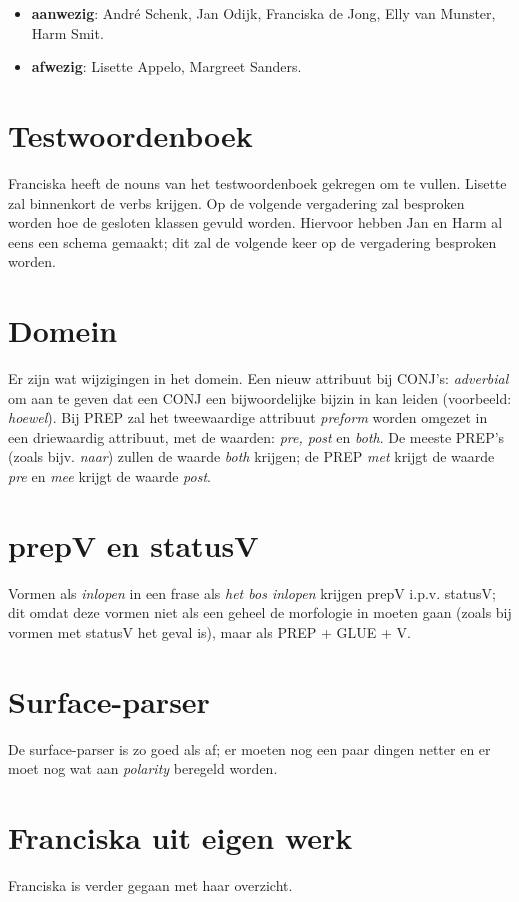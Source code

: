 

   \RosSupersedes{-}
   \MakeRosTitle
%
%

\begin{itemize}
  \item {\bf aanwezig}: Andr\'{e} Schenk, 
             Jan Odijk, Franciska de Jong, 
             Elly van Munster, Harm Smit.
  \item {\bf afwezig}: Lisette Appelo, Margreet Sanders.
\end{itemize}

\section{Testwoordenboek}

Franciska heeft de nouns van het testwoordenboek gekregen om te vullen. Lisette
zal binnenkort de verbs krijgen. Op de volgende vergadering zal besproken 
worden hoe de gesloten klassen gevuld worden. Hiervoor hebben Jan en Harm al 
eens een schema gemaakt; dit zal de volgende keer op de vergadering besproken 
worden.

\section{Domein}

Er zijn wat wijzigingen in het domein. Een nieuw attribuut bij CONJ's:
{\em adverbial} om aan te geven dat een CONJ een bijwoordelijke bijzin in kan 
leiden (voorbeeld: {\em hoewel}). Bij PREP zal het tweewaardige attribuut 
{\em preform} worden omgezet in een driewaardig attribuut, met de waarden:
{\em pre, post} en {\em both}. De meeste PREP's (zoals bijv. {\em naar})
zullen de waarde {\em both} krijgen; de PREP {\em met} krijgt de waarde 
{\em pre} en {\em mee} krijgt de waarde {\em post}.

\section {prepV en statusV}

Vormen als {\em inlopen} in een frase als {\em het bos inlopen} krijgen prepV
i.p.v. statusV; dit omdat deze vormen niet als een geheel de morfologie in 
moeten gaan (zoals bij vormen met statusV het geval is), maar als PREP + GLUE + 
V.

\section{Surface-parser}

De surface-parser is zo goed als af; er moeten nog een paar dingen netter en er 
moet nog wat aan {\em polarity} beregeld worden.

\section{Franciska uit eigen werk}

Franciska is verder gegaan met haar overzicht.


